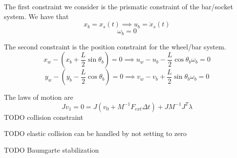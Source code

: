\documentclass[9pt]{article}
\begin{document}
The first constraint we consider is the prismatic constraint of the bar/socket system. We have that 
\[
x_b = x_s(t) \implies u_b = \dot{x}_s(t)
\]
\[
\omega_b = 0
\]

The second constraint is the position constraint for the wheel/bar system. 
\[
x_w - \left(x_b + \frac{L}{2}\sin \theta_b\right) = 0 \implies u_w - u_b - \frac{L}{2}\cos \theta_b \omega_b = 0
\]
\[
y_w - \left(y_b - \frac{L}{2}\cos \theta_b\right) = 0 \implies v_w - v_b + \frac{L}{2}\sin \theta_b \omega_b = 0
\]

The laws of motion are
\[
J v_1 = 0 = J (v_0 + M^{-1} F_{ext} \Delta t) + J M^{-1} J^T \lambda
\]
TODO collision constraint

TODO elastic collision can be handled by not setting to zero

TODO Baumgarte stabilization
\end{document}
